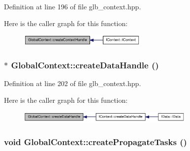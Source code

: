 Definition at line 196 of file glb\_\-context.hpp.

Here is the caller graph for this function:\nopagebreak
\begin{figure}[H]
\begin{center}
\leavevmode
\includegraphics[width=178pt]{class_global_context_a933e43be2a62ca16e4ffa34ce5cadb5c_icgraph}
\end{center}
\end{figure}
\hypertarget{class_global_context_aa3979e9a5f856d90384ebafb5ca9bf04}{
\subsubsection[{createDataHandle}]{$\ast$ GlobalContext::createDataHandle ()}}
\label{class_global_context_aa3979e9a5f856d90384ebafb5ca9bf04}


Definition at line 202 of file glb\_\-context.hpp.

Here is the caller graph for this function:\nopagebreak
\begin{figure}[H]
\begin{center}
\leavevmode
\includegraphics[width=246pt]{class_global_context_aa3979e9a5f856d90384ebafb5ca9bf04_icgraph}
\end{center}
\end{figure}
\hypertarget{class_global_context_ad56737fc110208d85069ac902b4cb97b}{
\subsubsection[{createPropagateTasks}]{\setlength{\rightskip}{0pt plus 5cm}void GlobalContext::createPropagateTasks ()}}
\label{class_global_context_ad56737fc110208d85069ac902b4cb97b}


